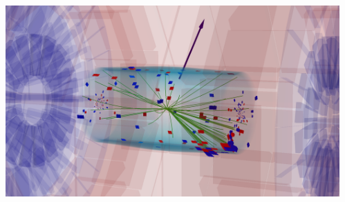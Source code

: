 \documentclass[aspectratio=169,xcolor=dvipsnames,,table,compress]{beamer}
\begin{document}
\begin{frame}
\begin{columns}
\begin{column}{0.6\textwidth}
    \end{column}
    \begin{column}{0.4\textwidth}
      \includegraphics[width=\textwidth]{../figures/talk/1275337_634520340_334_3DTower2.png}
    \end{column}
  \end{columns}
\end{frame}
\end{document}
